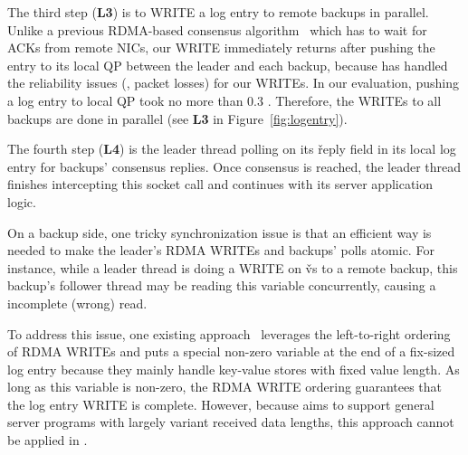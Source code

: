 The third step (\textbf{L3}) is to WRITE a log entry to remote backups 
in parallel. Unlike a previous RDMA-based consensus 
algorithm~\cite{dare:hpdc15} which has to wait for ACKs from remote NICs, our 
WRITE immediately returns after pushing the entry to its local QP between the 
leader and each backup, because \paxos has handled the reliability issues (\eg, 
packet losses) for our WRITEs. In our evaluation, pushing a log entry to local 
QP took no more than 0.3 \us. Therefore, the WRITEs to all backups are done in 
parallel (see \textbf{L3} in Figure~\ref{fig:logentry}).


The fourth step (\textbf{L4}) is the leader thread polling on its \v{reply} 
field in its local log entry for backups' consensus replies. Once consensus is 
reached, the leader thread finishes intercepting this \recv socket call and 
continues with its server application logic.

% 


On a backup side, one tricky synchronization issue is that an efficient way is 
needed to make the leader's RDMA WRITEs and backups' polls atomic. For instance, 
while a leader thread is doing a WRITE on \v{vs} to a remote backup, this 
backup's follower thread may be reading this variable concurrently, causing a 
incomplete (wrong) read.

To address this issue, one existing approach~\cite{farm:nsdi14,herd:sigcomm14} 
leverages the left-to-right ordering of RDMA WRITEs and puts a special 
non-zero variable at the end of a fix-sized log entry because they mainly 
handle key-value stores with fixed value length. As long as this variable is 
non-zero, the RDMA WRITE ordering guarantees that the log entry WRITE is 
complete. However, because \xxx aims to support general server programs with 
largely variant received data lengths, this approach cannot be applied in \xxx.

